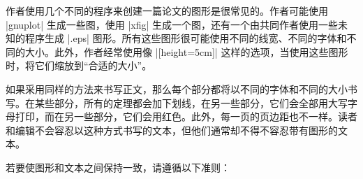 作者使用几个不同的程序来创建一篇论文的图形是很常见的。作者可能使用 |gnuplot| 生成一些图，使用 |xfig| 生成一个图，还有一个由共同作者使用一些未知的程序生成 |.eps| 图形。所有这些图形很可能使用不同的线宽、不同的字体和不同的大小。此外，作者经常使用像 |[height=5cm]| 这样的选项，当使用这些图形时，将它们缩放到``合适的大小''。


如果采用同样的方法来书写正文，那么每个部分都将以不同的字体和不同的大小书写。在某些部分，所有的定理都会加下划线，在另一些部分，它们会全部用大写字母打印，而在另一些部分，它们会用红色。此外，每一页的页边距也不一样。读者和编辑不会容忍以这种方式书写的文本，但他们通常却不得不容忍带有图形的文本。


若要使图形和文本之间保持一致，请遵循以下准则：

